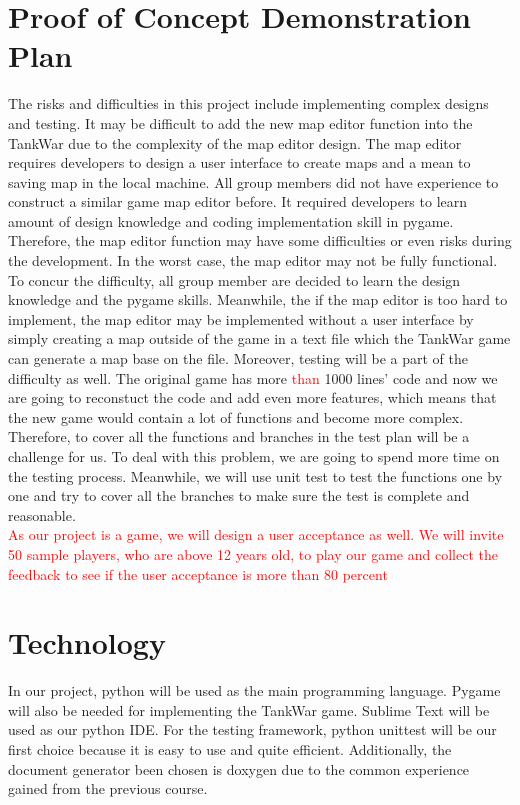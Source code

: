 \documentclass{article}
\begin{document}
\section{Proof of Concept Demonstration Plan}
The risks and difficulties in this project include implementing complex designs and testing. It may be difficult to add the new map editor function into the TankWar due to the complexity of the map editor design. The map editor requires developers to design a user interface to create maps and a mean to saving map in the local machine. All group members did not have experience to construct a similar game map editor before. It required developers to learn amount of design knowledge and coding implementation skill in pygame. Therefore, the map editor function may have some difficulties or even risks during the development. In the worst case, the map editor may not be fully functional. To concur the difficulty, all group member are decided to learn the design knowledge and the pygame skills. Meanwhile, the if the map editor is too hard to implement, the map editor may be implemented without a user interface by simply creating a map outside of the game in a text file which the TankWar game can generate a map base on the file. Moreover, testing will be a part of the difficulty as well. The original game has more \textcolor{red}{than} 1000 lines' code and now we are going to reconstuct the code and add even more features, which means that the new game would contain a lot of functions and become more complex. Therefore, to cover all the functions and branches in the test plan will be a challenge for us. To deal with this problem, we are going to spend more time on the testing process. Meanwhile, we will use unit test to test the functions one by one and try to cover all the branches to make sure the test is complete and reasonable.\\
\textcolor{red}{As our project is a game, we will design a user acceptance as well. We will invite 50 sample players, who are above 12 years old, to play our game and collect the feedback to see if the user acceptance is more than 80 percent}

\section{Technology}
In our project, python will be used as the main programming language. Pygame will also be needed for implementing the TankWar game. Sublime Text will be used as our python IDE. For the testing framework, python unittest will be our first choice because it is easy to use and quite efficient. Additionally, the document generator been chosen is doxygen due to the common experience gained from the previous course.
\end{document}
